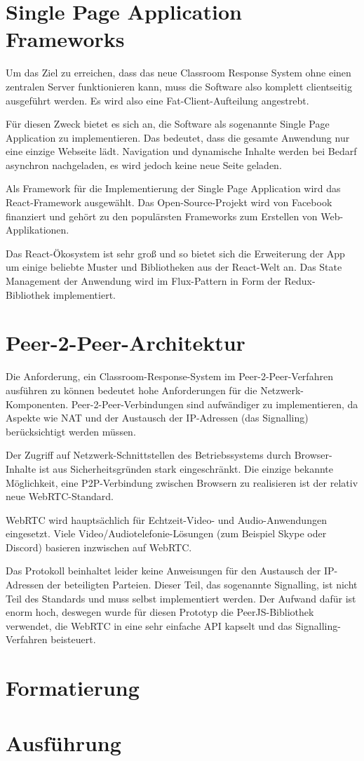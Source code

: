 \section{Single Page Application Frameworks}
\label{chap:validierung}
Um das Ziel zu erreichen, dass das neue Classroom Response System ohne einen zentralen Server funktionieren kann, muss die Software also komplett clientseitig ausgeführt werden. Es wird also eine Fat-Client-Aufteilung angestrebt.

Für diesen Zweck bietet es sich an, die Software als sogenannte Single Page Application zu implementieren. Das bedeutet, dass die gesamte Anwendung nur eine einzige Webseite lädt. Navigation und dynamische Inhalte werden bei Bedarf asynchron nachgeladen, es wird jedoch keine neue Seite geladen.

Als Framework für die Implementierung der Single Page Application wird das React-Framework ausgewählt. Das Open-Source-Projekt wird von Facebook finanziert und gehört zu den populärsten Frameworks zum Erstellen von Web-Applikationen.

Das React-Ökosystem ist sehr groß und so bietet sich die Erweiterung der App um einige beliebte Muster und Bibliotheken aus der React-Welt an. Das State Management der Anwendung wird im Flux-Pattern in Form der Redux-Bibliothek implementiert.


%
\section{Peer-2-Peer-Architektur}
\label{chap:simulator}
Die Anforderung, ein Classroom-Response-System im Peer-2-Peer-Verfahren ausführen zu können bedeutet hohe Anforderungen für die Netzwerk-Komponenten. Peer-2-Peer-Verbindungen sind aufwändiger zu implementieren, da Aspekte wie NAT und der Austausch der IP-Adressen (das Signalling) berücksichtigt werden müssen.

Der Zugriff auf Netzwerk-Schnittstellen des Betriebssystems durch Browser-Inhalte ist aus Sicherheitsgründen stark eingeschränkt. Die einzige bekannte Möglichkeit, eine P2P-Verbindung zwischen Browsern zu realisieren ist der relativ neue WebRTC-Standard.

WebRTC wird hauptsächlich für Echtzeit-Video- und Audio-Anwendungen eingesetzt. Viele Video/Audiotelefonie-Lösungen (zum Beispiel Skype oder Discord) basieren inzwischen auf WebRTC.

Das Protokoll beinhaltet leider keine Anweisungen für den Austausch der IP-Adressen der beteiligten Parteien. Dieser Teil, das sogenannte Signalling, ist nicht Teil des Standards und muss selbst implementiert werden. Der Aufwand dafür ist enorm hoch, deswegen wurde für diesen Prototyp die PeerJS-Bibliothek verwendet, die WebRTC in eine sehr einfache API kapselt und das Signalling-Verfahren beisteuert.
%
\section{Formatierung}
\label{chap:metriken}

%
\section{Ausführung}
\label{chap:metriken}
